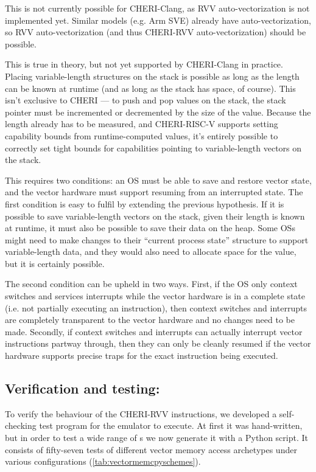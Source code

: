 This is not currently possible for CHERI-Clang, as RVV auto-vectorization is not implemented yet.
Similar models (e.g. Arm SVE) already have auto-vectorization, so RVV auto-vectorization (and thus CHERI-RVV auto-vectorization) should be possible.

This is true in theory, but not yet supported by CHERI-Clang in practice.
Placing variable-length structures on the stack is possible as long as the length can be known at runtime (and as long as the stack has space, of course).
This isn't exclusive to CHERI --- to push and pop values on the stack, the stack pointer must be incremented or decremented by the size of the value.
Because the length already has to be measured, and CHERI-RISC-V supports setting capability bounds from runtime-computed values, it's entirely possible to correctly set tight bounds for capabilities pointing to variable-length vectors on the stack.

This requires two conditions: an OS must be able to save and restore vector state, and the vector hardware must support resuming from an interrupted state.
The first condition is easy to fulfil by extending the previous hypothesis. 
If it is possible to save variable-length vectors on the stack, given their length is known at runtime, it must also be possible to save their data on the heap.
Some OSs might need to make changes to their ``current process state'' structure to support variable-length data, and they would also need to allocate space for the  value, but it is certainly possible.

The second condition can be upheld in two ways.
First, if the OS only context switches and services interrupts while the vector hardware is in a complete state (i.e. not partially executing an instruction), then context switches and interrupts are completely transparent to the vector hardware and no changes need to be made.
Secondly, if context switches and interrupts can actually interrupt vector instructions partway through, then they can only be cleanly resumed if the vector hardware supports precise traps for the exact instruction being executed.

\subsection{Verification and testing: }\label{chap:software:eval}
To verify the behaviour of the CHERI-RVV instructions, we developed a self-checking test program for the emulator to execute.
At first it was hand-written, but in order to test a wide range of s we now generate it with a Python script.
It consists of fifty-seven tests of different vector memory access archetypes under various configurations (\cref{tab:vectormemcpyschemes}).


